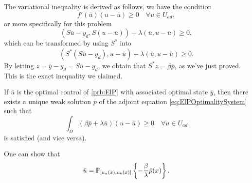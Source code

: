 \documentclass[../skript.tex]{subfiles}
\begin{document}
The variational inequality is derived as follows, we have the condition
\[
	f'(\bar{u})(u - \bar{u}) \geq 0 \quad \forall u \in U_{ad},
\]
or more specifically for this problem
\[
	(S \bar{u} - y_d, S(u - \bar{u})) + \lambda (\bar{u}, u - \bar{u}) \geq 0,
\]
which can be transformed by using $S^*$ into
\[
	(S^* (S \bar{u} - y_d), u - \bar{u}) + \lambda (\bar{u}, u - \bar{u}) \geq 0.
\]
By letting $z = \bar{y} - y_d = S\bar{u} - y_d$, we obtain that $S^* z = \beta \bar{p}$, as we've just proved. This is the exact inequality we claimed.

If $\bar{u}$ is the optimal control of \cref{prb:ElP} with associated optimal state $\bar{y}$, then there exists a unique weak solution $\bar{p}$ of the adjoint equation \cref{eq:ElPOptimalitySystem} such that
\[
	\int_\Omega (\beta \bar{p} + \lambda \bar{u})(u - \bar{u}) \geq 0 \quad \forall u \in U_{ad}
\]
is satisfied (and vice versa).

One can show that
\[
	\bar{u} = \mathbb{P}_{[u_a(x), u_b(x)]} \left\{ - \frac{\beta}{\lambda} \bar{p}(x) \right\}.
\]
\end{document}
